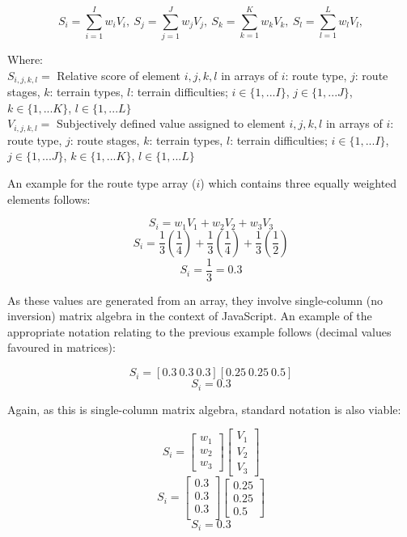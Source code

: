 \documentclass[11pt, english]{article}
\begin{document}
	$$S_{i}=\sum^{I}_{i=1} w_{i}V_{i},\ S_{j}=\sum^{J}_{j=1} w_{j}V_{j},\ S_{k}=\sum^{K}_{k=1} w_{k}V_{k},\ S_{l}=\sum^{L}_{l=1} w_{l}V_{l},$$

	Where:\\
	$S_{i,j,k,l}=$ Relative score of element $i,j,k,l$ in arrays of $i$: route type, $j$: route stages, $k$: terrain types, $l$: terrain difficulties; $i\in\{1,...I\}$, $j\in\{1,...J\}$, $k\in\{1,...K\}$, $l\in\{1,...L\}$\\
	$V_{i,j,k,l}=$ Subjectively defined value assigned to element $i,j,k,l$ in arrays of $i$: route type, $j$: route stages, $k$: terrain types, $l$: terrain difficulties; $i\in\{1,...I\}$, $j\in\{1,...J\}$, $k\in\{1,...K\}$, $l\in\{1,...L\}$\\

\newpage

	An example for the route type array ($i$) which contains three equally weighted elements follows:

	$$S_{i}=w_{1}V_{1}+w_{2}V_{2}+w_{3}V_{3}$$
	$$S_{i}=\frac{1}{3}\left(\frac{1}{4}\right)+\frac{1}{3}\left(\frac{1}{4}\right)+\frac{1}{3}\left(\frac{1}{2}\right)$$
	$$S_{i}=\frac{1}{3}=0.\textrm{\.{3}}$$
	
	As these values are generated from an array, they involve single-column (no inversion) matrix algebra in the context of JavaScript. An example of the appropriate notation relating to the previous example follows (decimal values favoured in matrices):

	$$S_{i}=\left[0.\textrm{\.{3}}\ 0.\textrm{\.{3}}\ 0.\textrm{\.{3}}\right]\left[0.25\ 0.25\ 0.5\right]$$
	$$S_{i}=0.\textrm{\.{3}}$$

	Again, as this is single-column matrix algebra, standard notation is also viable:

	$$S_{i}=\begin{bmatrix}w_{1}\\w_{2}\\w_{3}\end{bmatrix}\begin{bmatrix}V_{1}\\V_{2}\\V_{3}\end{bmatrix}$$
	$$S_{i}=\begin{bmatrix}0.\textrm{\.{3}}\\0.\textrm{\.{3}}\\0.\textrm{\.{3}}\\\end{bmatrix}\begin{bmatrix}0.25\\0.25\\0.5\end{bmatrix}$$
	$$S_{i}=0.\textrm{\.{3}}$$
\end{document}
